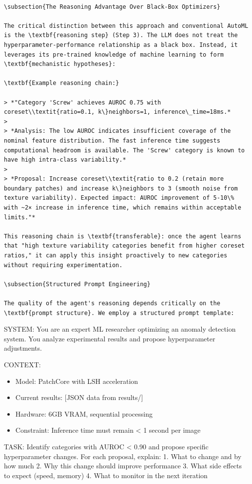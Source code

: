 \documentclass[12pt,a4paper,oneside]{report}
\begin{document}
\begin{verbatim}

\subsection{The Reasoning Advantage Over Black-Box Optimizers}

The critical distinction between this approach and conventional AutoML is the \textbf{reasoning step} (Step 3). The LLM does not treat the hyperparameter-performance relationship as a black box. Instead, it leverages its pre-trained knowledge of machine learning to form \textbf{mechanistic hypotheses}:

\textbf{Example reasoning chain:}

> *"Category 'Screw' achieves AUROC 0.75 with coreset\\textit{ratio=0.1, k\}neighbors=1, inference\_time=18ms.*
>
> *Analysis: The low AUROC indicates insufficient coverage of the nominal feature distribution. The fast inference time suggests computational headroom is available. The 'Screw' category is known to have high intra-class variability.*
>
> *Proposal: Increase coreset\\textit{ratio to 0.2 (retain more boundary patches) and increase k\}neighbors to 3 (smooth noise from texture variability). Expected impact: AUROC improvement of 5-10\% with ~2× increase in inference time, which remains within acceptable limits."*

This reasoning chain is \textbf{transferable}: once the agent learns that "high texture variability categories benefit from higher coreset ratios," it can apply this insight proactively to new categories without requiring experimentation.

\subsection{Structured Prompt Engineering}

The quality of the agent's reasoning depends critically on the \textbf{prompt structure}. We employ a structured prompt template:

\end{verbatim}
SYSTEM: You are an expert ML researcher optimizing an anomaly 
detection system. You analyze experimental results and propose 
hyperparameter adjustments.

CONTEXT:
\begin{itemize}
  \item Model: PatchCore with LSH acceleration
  \item Current results: [JSON data from results/]
  \item Hardware: 6GB VRAM, sequential processing
  \item Constraint: Inference time must remain < 1 second per image
\end{itemize}
TASK: Identify categories with AUROC < 0.90 and propose specific
hyperparameter changes. For each proposal, explain:
1. What to change and by how much
2. Why this change should improve performance  
3. What side effects to expect (speed, memory)
4. What to monitor in the next iteration
\end{document}
